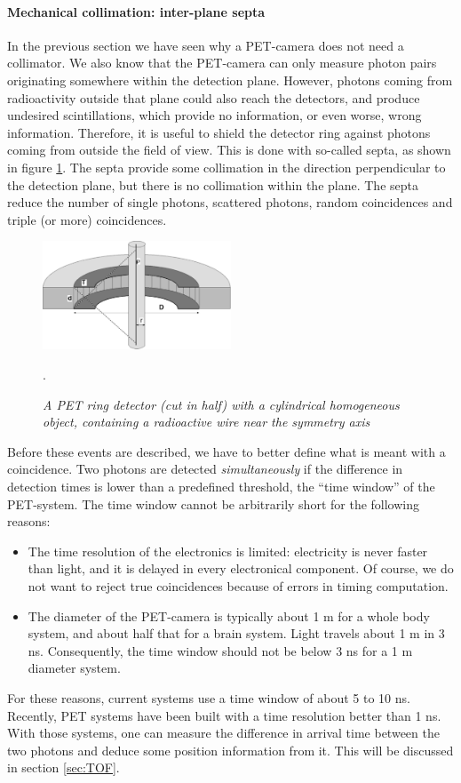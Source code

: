 \documentclass[11pt,oneside]{article}
\begin{document}
\paragraph{Mechanical collimation: inter-plane septa} \label{sec:septa}
In the previous section we have seen why a PET-camera does not need a
collimator. We also know that the PET-camera can only measure photon pairs
originating somewhere within the detection plane. However, photons coming from
radioactivity outside that plane could also reach the detectors, and produce
undesired scintillations, which provide no information, or even worse, wrong
information. Therefore, it is useful to shield the detector ring against
photons coming from outside the field of view. This is done with so-called
septa, as shown in figure \ref{fig:pet_septa}. The septa provide some
collimation in the direction perpendicular to the detection plane, but there is
no collimation within the plane. The septa reduce the number of single
photons, scattered photons, random coincidences and triple (or more)
coincidences.

%
\begin{figure}[tb]
\centering
\includegraphics[width=0.5\textwidth]{figs/fig_pet_septa.pdf}
\caption{\label{fig:pet_septa} \emph{A PET ring detector (cut in half) with a
cylindrical homogeneous object, containing a radioactive wire near the
symmetry axis}}.
\end{figure}

Before these events are described, we have to better define what is meant with
a coincidence. Two photons are detected {\em simultaneously} if the difference
in detection times is lower than a predefined threshold, the ``time window''
of the PET-system. The time window cannot be arbitrarily short for the
following reasons:
\begin{itemize}
  \item The time resolution of the electronics is limited: electricity is
        never faster than light, and it is delayed in every electronical
        component.  Of course, we do not want to reject true coincidences
        because of errors in timing computation.
  \item The diameter of the PET-camera is typically about 1 m for a
        whole body system, and about half that for a brain
        system. Light travels about 1 m in 3 ns. Consequently, the
        time window should not be below 3 ns for a 1 m diameter
        system.
\end{itemize}
For these reasons, current systems use a time window of about 5 to 10
ns. Recently, PET systems have been built with a time resolution
better than 1 ns. With those systems, one can measure the difference
in arrival time between the two photons and deduce some position
information from it. This will be discussed in section \ref{sec:TOF}.
\end{document}
